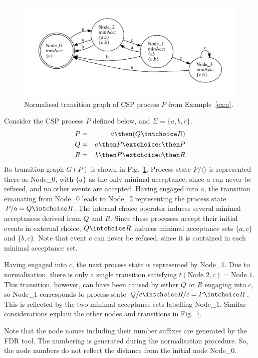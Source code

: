  \begin{figure}[t]
   \begin{center}
     \includegraphics[width=\textwidth]{q0.pdf}
   \end{center}
   \caption{Normalised transition graph of CSP process $P$ from Example~\ref{ex:a}.}
   \label{fig:tga}
 \end{figure}

\begin{example}\label{ex:a}
Consider the CSP process $P$ defined below, and $\Sigma = \{a,b,c\}$.
\begin{eqnarray*}
P & = & a \then (Q\intchoice R)
\\
Q & = & a \then P \extchoice c \then P
\\
R & = & b \then P \extchoice c \then R
\end{eqnarray*}
Its transition graph $G(P)$ is shown in Fig.~\ref{fig:tga}. Process state
$P/\langle\rangle$ is represented there as Node\_0, with $\{ a\}$ as the
only minimal acceptance, since $a$ can never be refused, and no other events are
accepted. Having engaged into $a$, the transition emanating from Node\_0
leads to Node\_2 representing  the process state $P/a = Q\intchoice R$. The
internal choice operator induces several minimal acceptances derived from $Q$ and
$R$. Since these processes accept their initial events in external choice,
$Q\intchoice R$ induces minimal acceptance sets $\{a,c\}$ and
$\{b,c\}$. Note that event $c$ can never be refused, since it is contained in each minimal acceptance set.

Having engaged into $c$, the next process state is represented by Node\_1.
Due to normalisation, there is only a single transition satisfying
$t(\text{Node\_2},c) = \text{Node\_1}$. This transition, however, can have
been caused by either $Q$ or $R$ engaging into $c$, so Node\_1 corresponds to
process state $Q/c \intchoice R/c = P \intchoice R$. This is reflected by the
two minimal acceptance sets labelling Node\_1.
Similar considerations explain the other nodes and transitions in
Fig.~\ref{fig:tga}.

Note that the node names including their number suffixes are generated by the
FDR tool. The numbering is generated during the normalisation procedure. So,
the node numbers do not reflect the distance from the initial node Node\_0.
\xbox
\end{example}


